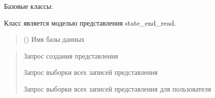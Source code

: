 \documentclass[letterpaper,10pt,russian]{sphinxmanual}
\begin{document}
\begin{fulllineitems}
\label{\detokenize{database.sqlite3_interface.views:database.sqlite3_interface.views.view_end_read.ViewEndRead}}
\pysigstartsignatures
{}
\pysigstopsignatures
\sphinxAtStartPar
Базовые классы: {\hyperref[\detokenize{database.sqlite3_interface.views:database.sqlite3_interface.views.view.View}]{}}

\sphinxAtStartPar
Класс является моделью представления state\_end\_read.
\begin{quote}\begin{description}
\sphinxAtStartPar
{} () \textendash{} Имя базы данных

\end{description}\end{quote}
\begin{description}
\begin{quote}\begin{description}
\sphinxAtStartPar
Запрос создания представления

\sphinxAtStartPar
Запрос выборки всех записей представления

\sphinxAtStartPar
Запрос выборки всех записей представления для пользователя

\end{description}\end{quote}


\end{description}
\end{fulllineitems}
\end{document}
